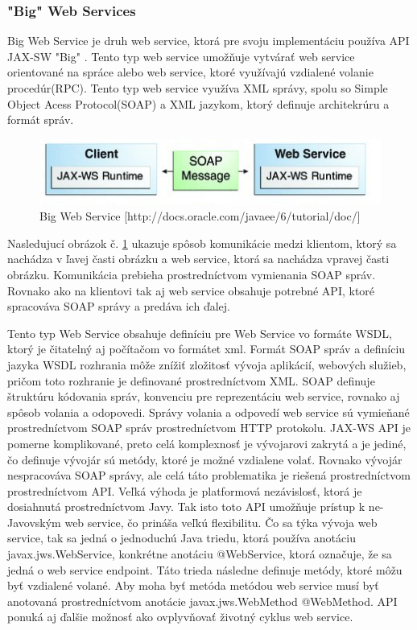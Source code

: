 \subsubsection{"Big" Web Services}
Big Web Service je druh web service, ktorá pre svoju implementáciu používa API JAX-SW\cite{fitWeb} "Big" . Tento typ web service umožňuje vytvárať web service orientované na spráce alebo web service, ktoré využívajú vzdialené volanie procedúr(RPC). Tento typ web service využíva XML správy, spolu so Simple Object Acess Protocol(SOAP) a XML jazykom, ktorý definuje architekrúru a formát správ.
\begin{figure}[htb]

\begin{center}

\includegraphics[scale=0.5]{webservice.jpg} 
\caption{Big Web Service [http://docs.oracle.com/javaee/6/tutorial/doc/] }
\label{com}

\end{center}

\end{figure}
Nasledujucí obrázok č. \ref{com} ukazuje spôsob komunikácie medzi klientom, ktorý sa nachádza v ľavej časti obrázku a web service, ktorá sa nachádza vpravej časti obrázku. Komunikácia prebieha prostredníctvom vymienania SOAP správ. Rovnako ako na klientovi tak aj web service obsahuje potrebné API, ktoré spracováva SOAP správy a predáva ich ďalej.


 Tento typ Web Service obsahuje definíciu pre Web Service vo formáte WSDL, ktorý je čitatelný aj počítačom vo formátet xml. Formát SOAP správ a definíciu jazyka WSDL rozhrania môže znížiť zložitosť vývoja aplikácií, webových služieb, pričom toto rozhranie je definované prostredníctvom XML. SOAP definuje štruktúru kódovania správ, konvenciu pre reprezentáciu web service, rovnako aj spôsob volania a odopovedi. Správy volania a odpovedí web service sú vymieňané prostredníctvom SOAP správ prostredníctvom HTTP protokolu. JAX-WS API je pomerne komplikované, preto celá komplexnosť je vývojarovi zakrytá a je jediné, čo definuje vývojár sú metódy, ktoré je možné vzdialene volať. Rovnako vývojár nespracováva SOAP správy, ale celá táto problematika je riešená prostredníctvom prostredníctvom API. Veľká výhoda je platformová nezávislosť, ktorá je dosiahnutá prostredníctvom Javy. Tak isto toto API umožňuje prístup k ne-Javovským web service, čo prináša veľkú flexibilitu. Čo sa týka vývoja web service, tak sa jedná o jednoduchú Java triedu, ktorá používa anotáciu javax.jws.WebService, konkrétne anotáciu @WebService, ktorá označuje, že sa jedná o web service endpoint. Táto trieda následne definuje metódy, ktoré môžu byť vzdialené volané. Aby moha byť metóda metódou web service musí byť anotovaná prostredníctvom anotácie  javax.jws.WebMethod @WebMethod. API ponuká aj ďalšie možnosť ako ovplyvňovať životný cyklus web service.




